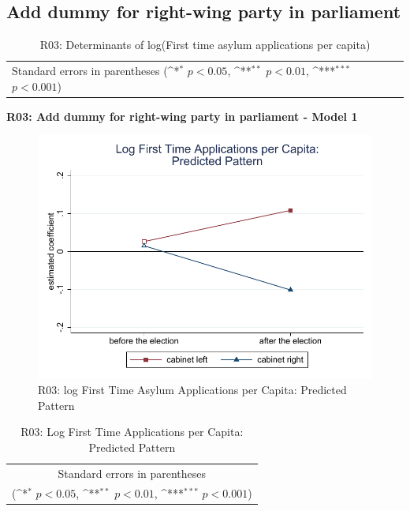 \documentclass[10pt,a4paper]{scrartcl}
\begin{document}


\clearpage
\FloatBarrier
\subsection{Add dummy for right-wing party in parliament}
\begin{table}[!ht]\centering
	\renewcommand{\arraystretch}{1.25}
	\small
	\def\sym#1{\ifmmode^{#1}\else\(^{#1}\)\fi}
	\caption{R03: Determinants of log(First time asylum applications per capita)}
	\begin{tabular}{l*{3}{c}}
		\hline\hline
		
		\hline\hline
		\multicolumn{4}{l}{\footnotesize Standard errors in parentheses (\sym{*} \(p<0.05\), \sym{**} \(p<0.01\), \sym{***} \(p<0.001\))}\\
	\end{tabular}
\end{table}

\clearpage
\textbf{R03: Add dummy for right-wing party in parliament - Model 1}
\begin{figure}[!ht]
	\centering
	\includegraphics[width=1\textwidth]{figures_edited/app_graph1_R03.pdf}
	\caption{R03: log First Time Asylum Applications per Capita: Predicted Pattern}
\end{figure}

\begin{table}[!ht]\centering
	\renewcommand{\arraystretch}{1.25}
	\def\sym#1{\ifmmode^{#1}\else\(^{#1}\)\fi}
	\caption{R03: Log First Time Applications per Capita: Predicted Pattern}
	\begin{tabular}{l*{2}{c}}
		\hline\hline
		
		\hline\hline
		\multicolumn{3}{c}{\footnotesize Standard errors in parentheses} \\
		\multicolumn{3}{c}{\footnotesize (\sym{*} \(p<0.05\), \sym{**} \(p<0.01\), \sym{***} \(p<0.001\))}\\
	\end{tabular}
\end{table}
\end{document}
